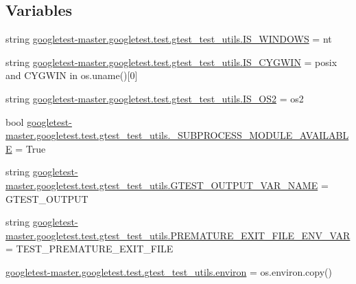 \subsection*{Variables}
\begin{DoxyCompactItemize}
\item 
string \mbox{\hyperlink{namespacegoogletest-master_1_1googletest_1_1test_1_1gtest__test__utils_a226979431c676d849e923b3eff36383a}{googletest-\/master.\+googletest.\+test.\+gtest\+\_\+test\+\_\+utils.\+I\+S\+\_\+\+W\+I\+N\+D\+O\+WS}} = \textquotesingle{}nt\textquotesingle{}
\item 
string \mbox{\hyperlink{namespacegoogletest-master_1_1googletest_1_1test_1_1gtest__test__utils_a791250a80c836c012511b74970962b07}{googletest-\/master.\+googletest.\+test.\+gtest\+\_\+test\+\_\+utils.\+I\+S\+\_\+\+C\+Y\+G\+W\+IN}} = \textquotesingle{}posix\textquotesingle{} and \textquotesingle{}C\+Y\+G\+W\+IN\textquotesingle{} in os.\+uname()\mbox{[}0\mbox{]}
\item 
string \mbox{\hyperlink{namespacegoogletest-master_1_1googletest_1_1test_1_1gtest__test__utils_aa84d660ac78118cdf2a6d90ed5b7e4c4}{googletest-\/master.\+googletest.\+test.\+gtest\+\_\+test\+\_\+utils.\+I\+S\+\_\+\+O\+S2}} = \textquotesingle{}os2\textquotesingle{}
\item 
bool \mbox{\hyperlink{namespacegoogletest-master_1_1googletest_1_1test_1_1gtest__test__utils_a17e129d027d56f9c669a99cb0189f354}{googletest-\/master.\+googletest.\+test.\+gtest\+\_\+test\+\_\+utils.\+\_\+\+S\+U\+B\+P\+R\+O\+C\+E\+S\+S\+\_\+\+M\+O\+D\+U\+L\+E\+\_\+\+A\+V\+A\+I\+L\+A\+B\+LE}} = True
\item 
string \mbox{\hyperlink{namespacegoogletest-master_1_1googletest_1_1test_1_1gtest__test__utils_ac0e7f2adc878fcbdf9de3eb6fdb6d94b}{googletest-\/master.\+googletest.\+test.\+gtest\+\_\+test\+\_\+utils.\+G\+T\+E\+S\+T\+\_\+\+O\+U\+T\+P\+U\+T\+\_\+\+V\+A\+R\+\_\+\+N\+A\+ME}} = \textquotesingle{}G\+T\+E\+S\+T\+\_\+\+O\+U\+T\+P\+UT\textquotesingle{}
\item 
string \mbox{\hyperlink{namespacegoogletest-master_1_1googletest_1_1test_1_1gtest__test__utils_a38fa9a52e870b01501b88879fe173eff}{googletest-\/master.\+googletest.\+test.\+gtest\+\_\+test\+\_\+utils.\+P\+R\+E\+M\+A\+T\+U\+R\+E\+\_\+\+E\+X\+I\+T\+\_\+\+F\+I\+L\+E\+\_\+\+E\+N\+V\+\_\+\+V\+AR}} = \textquotesingle{}T\+E\+S\+T\+\_\+\+P\+R\+E\+M\+A\+T\+U\+R\+E\+\_\+\+E\+X\+I\+T\+\_\+\+F\+I\+LE\textquotesingle{}
\item 
\mbox{\hyperlink{namespacegoogletest-master_1_1googletest_1_1test_1_1gtest__test__utils_a8d0afbf7286703b2a637fd3bdc86a5ff}{googletest-\/master.\+googletest.\+test.\+gtest\+\_\+test\+\_\+utils.\+environ}} = os.\+environ.\+copy()

\end{DoxyCompactItemize}
